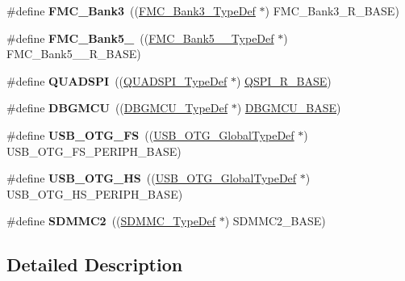 \begin{DoxyCompactItemize}
\#define {\bfseries F\+M\+C\+\_\+\+Bank3}~((\mbox{\hyperlink{struct_f_m_c___bank3___type_def}{F\+M\+C\+\_\+\+Bank3\+\_\+\+Type\+Def}} $\ast$) F\+M\+C\+\_\+\+Bank3\+\_\+\+R\+\_\+\+B\+A\+SE)
\item 
\mbox{\label{group___peripheral__declaration_gae3dcd4e05d7b9ffd6af1bd6c0d4f6960}} 
\#define {\bfseries F\+M\+C\+\_\+\+Bank5\+\_}~((\mbox{\hyperlink{struct_f_m_c___bank5__6___type_def}{F\+M\+C\+\_\+\+Bank5\+\_\+\_\+\+Type\+Def}} $\ast$) F\+M\+C\+\_\+\+Bank5\+\_\+\_\+\+R\+\_\+\+B\+A\+SE)
\item 
\mbox{\label{group___peripheral__declaration_gac7fb6e7a090282458855473a93385f66}} 
\#define {\bfseries Q\+U\+A\+D\+S\+PI}~((\mbox{\hyperlink{struct_q_u_a_d_s_p_i___type_def}{Q\+U\+A\+D\+S\+P\+I\+\_\+\+Type\+Def}} $\ast$) \mbox{\hyperlink{group___peripheral__memory__map_ga3b6b7d9c67dec50557fd634505198e9d}{Q\+S\+P\+I\+\_\+\+R\+\_\+\+B\+A\+SE}})
\item 
\mbox{\label{group___peripheral__declaration_ga92ec6d9ec2251fda7d4ce09748cd74b4}} 
\#define {\bfseries D\+B\+G\+M\+CU}~((\mbox{\hyperlink{struct_d_b_g_m_c_u___type_def}{D\+B\+G\+M\+C\+U\+\_\+\+Type\+Def}} $\ast$) \mbox{\hyperlink{group___peripheral__memory__map_ga4adaf4fd82ccc3a538f1f27a70cdbbef}{D\+B\+G\+M\+C\+U\+\_\+\+B\+A\+SE}})
\item 
\mbox{\label{group___peripheral__declaration_ga9ebb053ee138fb47cdfede0e3371123d}} 
\#define {\bfseries U\+S\+B\+\_\+\+O\+T\+G\+\_\+\+FS}~((\mbox{\hyperlink{struct_u_s_b___o_t_g___global_type_def}{U\+S\+B\+\_\+\+O\+T\+G\+\_\+\+Global\+Type\+Def}} $\ast$) U\+S\+B\+\_\+\+O\+T\+G\+\_\+\+F\+S\+\_\+\+P\+E\+R\+I\+P\+H\+\_\+\+B\+A\+SE)
\item 
\mbox{\label{group___peripheral__declaration_ga820f5f7cb0a7af72a2444a1903fd83bc}} 
\#define {\bfseries U\+S\+B\+\_\+\+O\+T\+G\+\_\+\+HS}~((\mbox{\hyperlink{struct_u_s_b___o_t_g___global_type_def}{U\+S\+B\+\_\+\+O\+T\+G\+\_\+\+Global\+Type\+Def}} $\ast$) U\+S\+B\+\_\+\+O\+T\+G\+\_\+\+H\+S\+\_\+\+P\+E\+R\+I\+P\+H\+\_\+\+B\+A\+SE)
\item 
\mbox{\label{group___peripheral__declaration_gac1879a9084422d36023d989557d8f051}} 
\#define {\bfseries S\+D\+M\+M\+C2}~((\mbox{\hyperlink{struct_s_d_m_m_c___type_def}{S\+D\+M\+M\+C\+\_\+\+Type\+Def}} $\ast$) S\+D\+M\+M\+C2\+\_\+\+B\+A\+SE)
\end{DoxyCompactItemize}


\subsection{Detailed Description}
